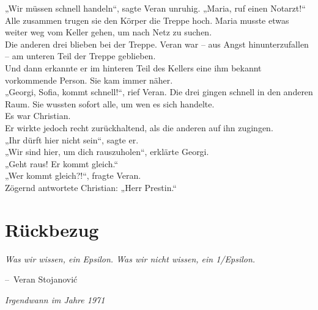 \documentclass[oneside]{memoir}
\makeatletter
\newenvironment{chapquote}[2][2em]
  {\setlength{\@tempdima}{#1}%
   \def\chapquote@author{#2}%
   \parshape 1 \@tempdima \dimexpr\textwidth-2\@tempdima\relax%
   \itshape}
  {\par\normalfont\hfill--\ \chapquote@author\hspace*{\@tempdima}\par\bigskip}
\makeatother
\begin{document}
\noindent „Wir müssen schnell handeln“, sagte Veran unruhig. „Maria, ruf einen Notarzt!“ \\
Alle zusammen trugen sie den Körper die Treppe hoch. Maria musste etwas weiter weg vom Keller gehen, um nach Netz zu suchen. \\
Die anderen drei blieben bei der Treppe. Veran war -- aus Angst hinunterzufallen -- am unteren Teil der Treppe geblieben. \\
Und dann erkannte er im hinteren Teil des Kellers eine ihm bekannt vorkommende Person. Sie kam immer näher. \\
„Georgi, Sofia, kommt schnell!“, rief Veran. Die drei gingen schnell in den anderen Raum. Sie wussten sofort alle, um wen es sich handelte. \\
Es war Christian. \\
Er wirkte jedoch recht zurückhaltend, als die anderen auf ihn zugingen. \\
„Ihr dürft hier nicht sein“, sagte er. \\
„Wir sind hier, um dich rauszuholen“, erklärte Georgi. \\
„Geht raus! Er kommt gleich.“ \\
„Wer kommt gleich?!“, fragte Veran. \\
Zögernd antwortete Christian: „Herr Prestin.“

\chapter{Rückbezug} %
\begin{chapquote}{Veran Stojanović}
\glqq Was wir wissen, ein Epsilon. Was wir nicht wissen, ein 1/Epsilon.\grqq
\end{chapquote}

\textit{Irgendwann im Jahre 1971}
\end{document}
